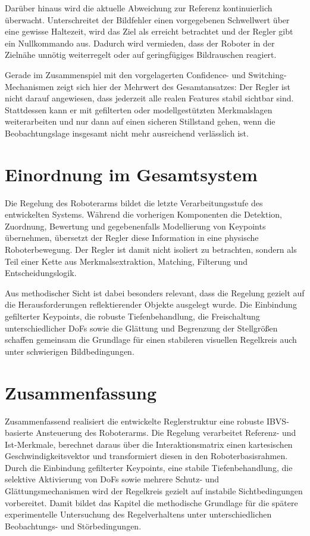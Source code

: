 Darüber hinaus wird die aktuelle Abweichung zur Referenz kontinuierlich überwacht. Unterschreitet der Bildfehler einen vorgegebenen Schwellwert über eine gewisse Haltezeit, wird das Ziel als erreicht betrachtet und der Regler gibt ein Nullkommando aus. Dadurch wird vermieden, dass der Roboter in der Zielnähe unnötig weiterregelt oder auf geringfügiges Bildrauschen reagiert.

\newpage
Gerade im Zusammenspiel mit den vorgelagerten Confidence- und Switching-Mechanismen zeigt sich hier der Mehrwert des Gesamtansatzes: Der Regler ist nicht darauf angewiesen, dass jederzeit alle realen Features stabil sichtbar sind. Stattdessen kann er mit gefilterten oder modellgestützten Merkmalslagen weiterarbeiten und nur dann auf einen sicheren Stillstand gehen, wenn die Beobachtungslage insgesamt nicht mehr ausreichend verlässlich ist.

\section{Einordnung im Gesamtsystem}
\label{sec:einordnung_gesamtsystem_regler}

Die Regelung des Roboterarms bildet die letzte Verarbeitungsstufe des entwickelten Systems. Während die vorherigen Komponenten die Detektion, Zuordnung, Bewertung und gegebenenfalls Modellierung von Keypoints übernehmen, übersetzt der Regler diese Information in eine physische Roboterbewegung. Der Regler ist damit nicht isoliert zu betrachten, sondern als Teil einer Kette aus Merkmalsextraktion, Matching, Filterung und Entscheidungslogik.

Aus methodischer Sicht ist dabei besonders relevant, dass die Regelung gezielt auf die Herausforderungen reflektierender Objekte ausgelegt wurde. Die Einbindung gefilterter Keypoints, die robuste Tiefenbehandlung, die Freischaltung unterschiedlicher \acp{DoF} sowie die Glättung und Begrenzung der Stellgrößen schaffen gemeinsam die Grundlage für einen stabileren visuellen Regelkreis auch unter schwierigen Bildbedingungen.

\section{Zusammenfassung}
\label{sec:zusammenfassung_regler}

Zusammenfassend realisiert die entwickelte Reglerstruktur eine robuste \ac{IBVS}-basierte Ansteuerung des Roboterarms. Die Regelung verarbeitet Referenz- und Ist-Merkmale, berechnet daraus über die Interaktionsmatrix einen kartesischen Geschwindigkeitsvektor und transformiert diesen in den Roboterbasisrahmen. Durch die Einbindung gefilterter Keypoints, eine stabile Tiefenbehandlung, die selektive Aktivierung von \acp{DoF} sowie mehrere Schutz- und Glättungsmechanismen wird der Regelkreis gezielt auf instabile Sichtbedingungen vorbereitet. Damit bildet das Kapitel die methodische Grundlage für die spätere experimentelle Untersuchung des Regelverhaltens unter unterschiedlichen Beobachtungs- und Störbedingungen.